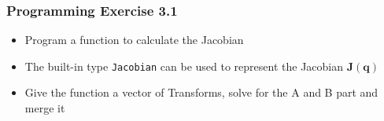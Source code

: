 \documentclass{beamer}
\begin{document}


\begin{frame}
  \frametitle{Programming Exercise 3.1}
  \begin{itemize}
  \item Program a function to calculate the Jacobian
  \item The built-in type \texttt{Jacobian} can be used to represent the Jacobian $\mathbf{J(q)}$
  \item Give the function a vector of Transforms, solve for the A and B part and merge it
  \end{itemize}
\end{frame}


\end{document}

